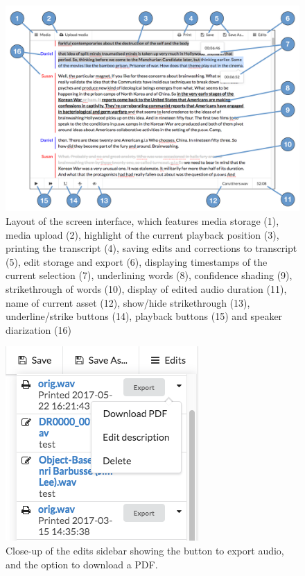 \begin{figure}[p]
  \centering
  \includegraphics[width=\columnwidth]{figs/discourse-interface-labelled.pdf}
  \caption{Layout of the screen interface, which features 
    media storage (1),
    media upload (2),
    highlight of the current playback position (3),
    printing the transcript (4),
    saving edits and corrections to transcript (5),
    edit storage and export (6),
    displaying timestamps of the current selection (7),
    underlining words (8),
    confidence shading (9),
    strikethrough of words (10),
    display of edited audio duration (11),
    name of current asset (12),
    show/hide strikethrough (13),
    underline/strike buttons (14),
    playback buttons (15)
  and speaker diarization (16)}
  \label{fig:dialogger-interface}
\end{figure}

\begin{figure}[p]
  \centering
  \includegraphics[width=0.4\columnwidth]{figs/discourse-download-pdf.png}
  \caption{Close-up of the edits sidebar showing the button to export audio, and the option to download a PDF.}
  \label{fig:download-pdf}
\end{figure}

